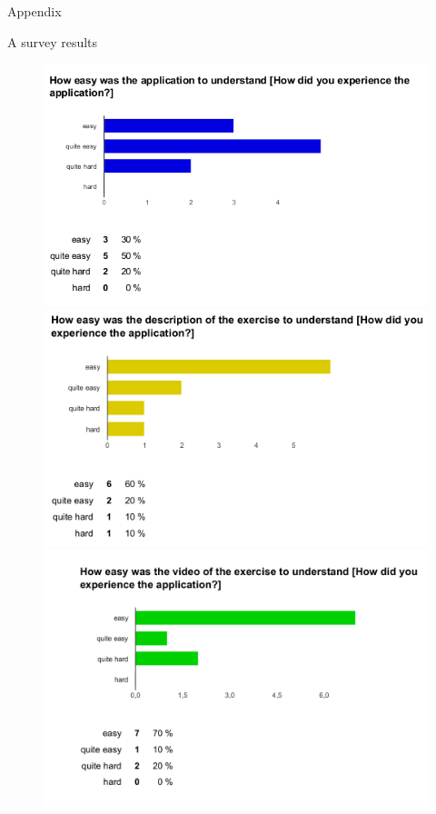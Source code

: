 \begin{LARGE}
Appendix\\
\end{LARGE}
A survey results
\begin{figure}[b!]
  \centering
    \begin{minipage}{0.6\textwidth}
      \centering
        \includegraphics[width=1\textwidth]{00_resources/figures/survey_results1.png}
    \end{minipage}
    \begin{minipage}{0.6\textwidth}
      \centering
        \includegraphics[width=1\textwidth]{00_resources/figures/survey_results2.png}
    \end{minipage}
    \begin{minipage}{0.6\textwidth}
      \centering
        \includegraphics[width=1\textwidth]{00_resources/figures/survey_results3.png}

\end{minipage}
\end{figure}
